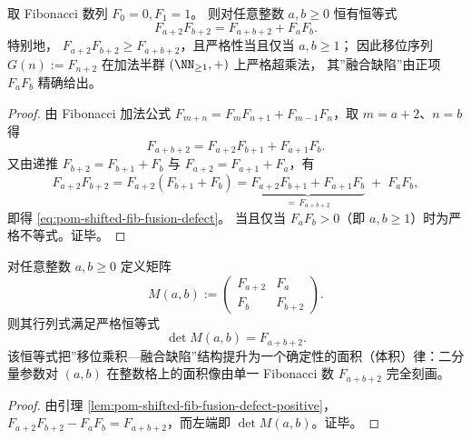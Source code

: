 \begin{lemma}\label{lem:pom-shifted-fib-fusion-defect-positive}
取 Fibonacci 数列 \(F_0=0,F_1=1\)。
则对任意整数 \(a,b\ge 0\) 恒有恒等式
\begin{equation}\label{eq:pom-shifted-fib-fusion-defect}
\boxed{\;
F_{a+2}F_{b+2}=F_{a+b+2}+F_aF_b.\;}
\end{equation}
特别地，
\(
F_{a+2}F_{b+2}\ge F_{a+b+2}
\)，且严格性当且仅当 \(a,b\ge 1\)；
因此移位序列 \(G(n):=F_{n+2}\) 在加法半群 \((\NN_{\ge 1},+)\) 上严格超乘法，
其”融合缺陷”由正项 \(F_aF_b\) 精确给出。
\end{lemma}
\begin{proof}
由 Fibonacci 加法公式
\(
F_{m+n}=F_mF_{n+1}+F_{m-1}F_n
\)，取 \(m=a+2\)、\(n=b\) 得
\[
F_{a+b+2}=F_{a+2}F_{b+1}+F_{a+1}F_b.
\]
又由递推 \(F_{b+2}=F_{b+1}+F_b\) 与 \(F_{a+2}=F_{a+1}+F_a\)，有
\[
F_{a+2}F_{b+2}
=F_{a+2}(F_{b+1}+F_b)
=\underbrace{F_{a+2}F_{b+1}+F_{a+1}F_b}_{=\,F_{a+b+2}}
\;+\;F_aF_b,
\]
即得 \eqref{eq:pom-shifted-fib-fusion-defect}。
当且仅当 \(F_aF_b>0\)（即 \(a,b\ge 1\)）时为严格不等式。证毕。
\end{proof}

\begin{corollary}\label{cor:pom-fib-determinant-volume-law}
对任意整数 \(a,b\ge 0\) 定义矩阵
\[
M(a,b):=\begin{pmatrix}
F_{a+2} & F_a\\
F_b & F_{b+2}
\end{pmatrix}.
\]
则其行列式满足严格恒等式
\[
\boxed{\;\det M(a,b)=F_{a+b+2}.\;}
\]
该恒等式把”移位乘积—融合缺陷”结构提升为一个确定性的面积（体积）律：二分量参数对 \((a,b)\) 在整数格上的面积像由单一 Fibonacci 数 \(F_{a+b+2}\) 完全刻画。
\end{corollary}
\begin{proof}
由引理 \ref{lem:pom-shifted-fib-fusion-defect-positive}，
\(
F_{a+2}F_{b+2}-F_aF_b=F_{a+b+2}
\)，而左端即 \(\det M(a,b)\)。证毕。
\end{proof}


